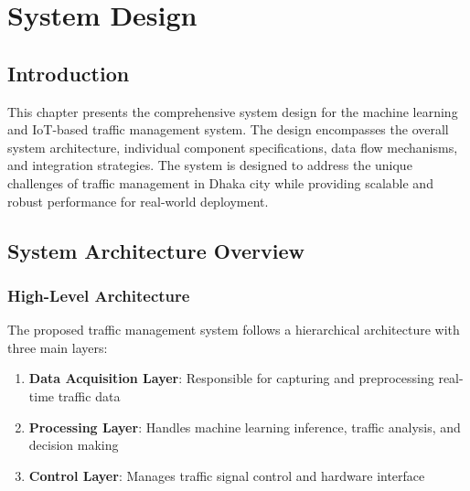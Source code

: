 \chapter{System Design}
\label{ch:system_design}

\section{Introduction}

This chapter presents the comprehensive system design for the machine learning and IoT-based traffic management system. The design encompasses the overall system architecture, individual component specifications, data flow mechanisms, and integration strategies. The system is designed to address the unique challenges of traffic management in Dhaka city while providing scalable and robust performance for real-world deployment.

\section{System Architecture Overview}

\subsection{High-Level Architecture}

The proposed traffic management system follows a hierarchical architecture with three main layers:

\begin{enumerate}
    \item \textbf{Data Acquisition Layer}: Responsible for capturing and preprocessing real-time traffic data
    \item \textbf{Processing Layer}: Handles machine learning inference, traffic analysis, and decision making
    \item \textbf{Control Layer}: Manages traffic signal control and hardware interface
\end{enumerate}

